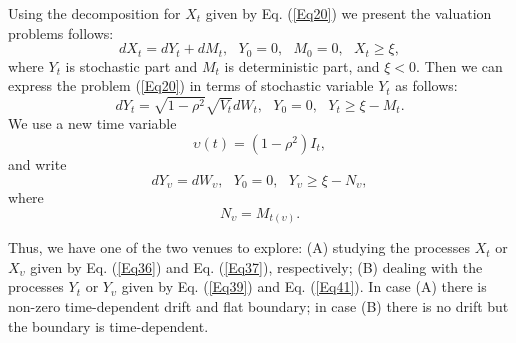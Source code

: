 \documentclass{article}
\begin{document}
Using the decomposition for $X_{t}$ given by Eq. (\ref{Eq20}) we present the
valuation problems follows: 
\begin{equation}
dX_{t}=dY_{t}+dM_{t},\ \ \ Y_{0}=0,\ \ \ M_{0}=0,\ \ \ X_{t}\geq \xi ,
\label{Eq38}
\end{equation}%
where $Y_{t}$ is stochastic part and $M_{t}$ is deterministic part, and $\xi
<0$. Then we can express the problem (\ref{Eq20}) in terms of stochastic
variable $Y_{t}$ as follows: 
\begin{equation}
dY_{t}=\sqrt{1-\rho ^{2}}\sqrt{V_{t}}dW_{t},\ \ \ Y_{0}=0,\ \ \ Y_{t}\geq
\xi -M_{t}.  \label{Eq39}
\end{equation}%
We use a new time variable%
\begin{equation}
\upsilon \left( t\right) =\left( 1-\rho ^{2}\right) I_{t},  \label{Eq40}
\end{equation}%
and write%
\begin{equation}
dY_{\upsilon }=dW_{\upsilon },\ \ \ Y_{0}=0,\ \ \ Y_{\upsilon }\geq \xi
-N_{\upsilon },  \label{Eq41}
\end{equation}%
where 
\begin{equation}
N_{\upsilon }=M_{t\left( \upsilon \right) }.  \label{Eq41a}
\end{equation}

Thus, we have one of the two venues to explore: (A) studying the processes $%
X_{t}$ or $X_{\upsilon }$ given by Eq. (\ref{Eq36}) and Eq. (\ref{Eq37}),
respectively; (B) dealing with the processes $Y_{t}$ or $Y_{\upsilon }$
given by Eq. (\ref{Eq39}) and Eq. (\ref{Eq41}). In case (A) there is
non-zero time-dependent drift and flat boundary; in case (B) there is no
drift but the boundary is time-dependent.
\end{document}
